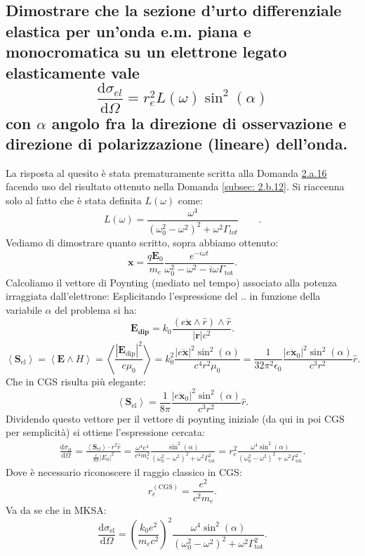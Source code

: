 \subsection[]{Dimostrare che la sezione d’urto differenziale elastica per un’onda e.m. piana e monocromatica su un elettrone legato elasticamente vale 
\[
	\frac{\mbox{d} \sigma_{el}}{\mbox{d} \Omega} = r_e^2 L\left( \omega \right) \sin^2\left( \alpha  \right)    
\]
con $\alpha$ angolo fra la direzione di osservazione e direzione di polarizzazione (lineare) dell'onda.} \label{subsec: 2.b.13}
La risposta al quesito è stata prematuramente scritta alla Domanda \hyperref[subsec: 2.a.16]{2.a.16} facendo uso del risultato ottenuto nella Domanda \ref{subsec: 2.b.12}.
Si riaccenna solo al fatto che è stata definita $L\left( \omega  \right)$ come:
\[ 
	L \left( \omega \right) = \frac{\omega^4}{\left( \omega_{0}^2 - \omega^2 \right)^2 + \omega^2 \Gamma_{tot} } \quad \quad 
.\] 
Vediamo di dimostrare quanto scritto, sopra abbiamo ottenuto:
\[
\boldsymbol{x} = \frac{q \boldsymbol{E}_0}{m_e} \frac{e^{-i \omega t}}{\omega _0^2 - \omega ^2 - i \omega \Gamma_{\text{tot}}} 
.\] 
Calcoliamo il vettore di Poynting (mediato nel tempo) associato alla potenza irraggiata dall'elettrone:
Esplicitando l'espressione del .. in funzione della variabile $\alpha$ del problema si ha:
\[
	\boldsymbol{E_{\text{dip}}} =k_0 \frac{\left( e\ddot{\boldsymbol{x}} \wedge \hat{r}\right) \wedge \hat{r}}{\left| \boldsymbol{r} \right| c^2} 
.\] 
\[
	\left<\boldsymbol{S}_{\text{el}} \right> = \left< \boldsymbol{E} \wedge H\right> = \left<\frac{\left| \boldsymbol{E}_{\text{dip}} \right|^2}{c \mu_0}  \right> = 
	k_0^2\frac{\left| e \ddot{\boldsymbol{x}}  \right|^2 \sin^2\left( \alpha  \right) }{c^4 r^2 \mu_0 } =
	\frac{1}{32 \pi^2 \epsilon_0} \frac{ \left| e \ddot{\boldsymbol{x}}_0 \right|^2 \sin^2\left( \alpha \right) }{c^3 r^2} \hat{r}
.\] 
Che in CGS risulta più elegante:
\[
\left<\boldsymbol{S}_{\text{el}} \right> = \frac{1}{8 \pi} \frac{ \left| e \ddot{\boldsymbol{x}}_0 \right|^2 \sin^2\left( \alpha \right) }{c^3 r^2} \hat{r} 
.\] 
Dividendo questo vettore per il vettore di poynting iniziale (da qui in poi CGS per semplicità) si ottiene l'espressione cercata:
\begin{align*}
\frac{\mbox{d} \sigma_{\text{el}}}{\mbox{d} \Omega} = \frac{\left< \boldsymbol{S}_{\text{el}} \right> \cdot r^2 \hat{r}}{\frac{c}{8 \pi}\left| E_0 \right|^2 } = 
\frac{ \omega^{4} e^{4}}{c^{4}m_e^2} \frac{\sin^2\left( \alpha  \right) }{\left( \omega _0^2 - \omega ^2 \right)^2 + \omega ^2 \Gamma_{\text{tot}}^2} =
r_e^2 \frac{\omega ^{4}\sin^2\left( \alpha \right)}{\left( \omega _0^2 - \omega ^2 \right)^2 + \omega ^2 \Gamma_{\text{tot}}^2}
.\end{align*}
Dove è necessario riconoscere il raggio classico in CGS:
\[
	r_e^{\left( \text{CGS} \right) } = \frac{e^2}{c^2m_e}
.\] 
Va da se che in MKSA:
\[
	\frac{\mbox{d} \sigma_{\text{el}}}{\mbox{d} \Omega} = \left( \frac{k_0 e^2}{m_e c^2} \right) ^2 \frac{\omega ^{4}\sin^2\left( \alpha \right)}{\left( \omega _0^2 - \omega ^2 \right)^2 + \omega ^2 \Gamma_{\text{tot}}^2}
.\] 


